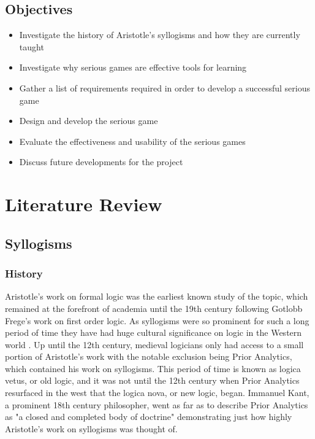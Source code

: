 \documentclass[12pt,a4paper]{report}
\begin{document}
\section{Objectives}

\begin{itemize}
  \item Investigate the history of Aristotle's syllogisms and how they are currently taught
  \item Investigate why serious games are effective tools for learning
  \item Gather a list of requirements required in order to develop a successful serious game
  \item Design and develop the serious game
  \item Evaluate the effectiveness and usability of the serious games
  \item Discuss future developments for the project
\end{itemize}






\chapter{Literature Review}
\section{Syllogisms}
\subsection{History}

Aristotle's work on formal logic was the earliest known study of the topic, which remained at the forefront of academia until the 19th century following Gotlobb Frege's work on first order logic. As syllogisms were so prominent for such a long period of time they have had huge cultural significance on logic in the Western world \citep{sep-aristotle-logic}. Up until the 12th century, medieval logicians only had access to a small portion of Aristotle's work with the notable exclusion being Prior Analytics, which contained his work on syllogisms. This period of time is known as logica vetus, or old logic, and it was not until the 12th century when Prior Analytics resurfaced in the west that the logica nova, or new logic, began. Immanuel Kant, a prominent 18th century philosopher, went as far as to describe Prior Analytics as "a closed and completed body of doctrine" demonstrating just how highly Aristotle's work on syllogisms was thought of.
\end{document}
